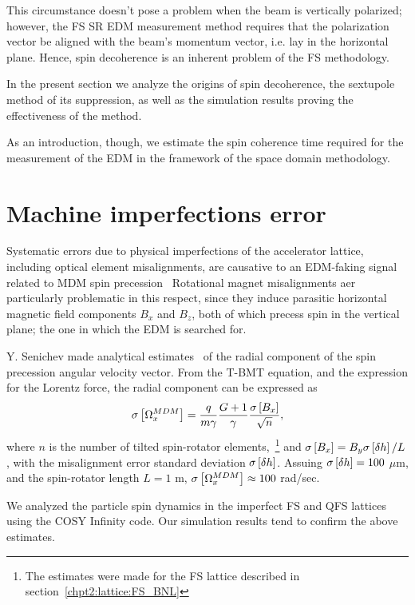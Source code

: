 This circumstance doesn't pose a problem when the beam is vertically polarized;
however, the FS SR EDM measurement method requires that the polarization vector be aligned with
the beam's momentum vector, i.e. lay in the horizontal plane. Hence, spin decoherence is an
inherent problem of the FS methodology.

In the present section we analyze the origins of spin decoherence,
the sextupole method of its suppression, as well as the simulation results
proving the effectiveness of the method.

As an introduction, though, we estimate the spin coherence time required for
the measurement of the EDM in the framework of the space domain methodology.



\section{Machine imperfections error}\label{chpt3:imperfections}
Systematic errors due to physical imperfections of the accelerator lattice, including
optical element misalignments, are causative to an EDM-faking signal 
related to MDM spin precession~\cite[з.~230]{Eremey:Thesis} Rotational magnet misalignments 
aer particularly problematic in this respect, since they induce parasitic horizontal magnetic field
components $B_x$ and $B_z$, both of which precess spin in the vertical plane; the one in which
the EDM is searched for.

Y. Senichev made analytical estimates~\cite{Senichev:FDM}  of the radial component of
the spin precession angular velocity vector. From the T-BMT equation, and the expression for
the Lorentz force, the radial component can be expressed as 
\begin{equation}
\SD{\W_x^{MDM}} = \frac{q}{m\gamma}\frac{G+1}{\gamma}\frac{\SD{B_x}}{\sqrt{n}},
\end{equation}
where $n$ is the number of tilted spin-rotator elements,~\footnote{The estimates were made for
the FS lattice described in section~\ref{chpt2:lattice:FS_BNL}} and $\SD{B_x} = B_y \SD{\delta h}/L$, 
with the misalignment error standard deviation $\SD{\delta h}$. Assuing $\SD{\delta h} = 100$ $\mu$m, 
and the spin-rotator length $L=1$ m, $\SD{\W_x^{MDM}} \approx 100$ rad/sec.~\cite{Senichev:FDM}

We analyzed the particle spin dynamics in the imperfect FS and QFS lattices using the COSY Infinity code. 
Our simulation results tend to confirm the above estimates.

